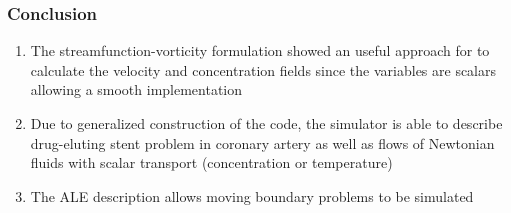 
\begin{frame}
 \frametitle{\LARGE Conclusion}
 \vspace{-1cm}
\begin{enumerate}
 \justifying
 \small

 
 \item The streamfunction-vorticity formulation showed an useful approach for to calculate
       the velocity and concentration fields since the variables are scalars allowing a
       smooth implementation\\

 \vspace{0.3cm}

 \item Due to generalized construction of the code, the simulator is able to describe
       drug-eluting stent problem in coronary artery as well as flows of Newtonian fluids
       with scalar transport (concentration or temperature)\\

 \vspace{0.3cm}

 \item The ALE description allows moving boundary problems to be simulated
\end{enumerate}
\end{frame}

